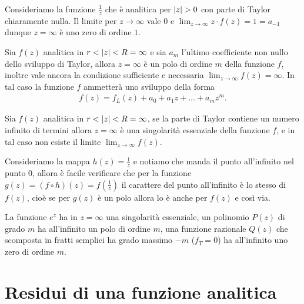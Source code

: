 \begin{example}
  Consideriamo la funzione $ \frac1z $ che è analitica per $ \left|{z}\right| > 0 $ con parte di Taylor chiaramente nulla. Il limite per $ z \to \infty $ vale 
  $ 0 $ e $ \lim_{z\to\infty} z \cdot f(z) = 1 = a_{-1} $ dunque $ z = \infty $ è uno zero di ordine $ 1 $.
\end{example}

\begin{definition}[  ]
  Sia $ f(z) $ analitica in $ r < \left|{z}\right| < R = \infty $ e sia $ a_{m} $ l'ultimo coefficiente non nullo dello sviluppo di Taylor, allora $ z = \infty $ 
  è un polo di ordine $ m $ della funzione $ f $, inoltre vale ancora la condizione sufficiente e necessaria $ \lim_{z\to \infty} f(z) = \infty $.
  In tal caso la funzione $ f $ ammetterà uno sviluppo della forma 
  \begin{align}
    f(z) = f_L(z) + a_0 + a_1 z + \dots + a_m z^m.
  \end{align}
\end{definition}

\begin{definition}[  ]
  Sia $ f(z) $ analitica in $ r < \left|{z}\right| < R = \infty $, se la parte di Taylor contiene un numero infinito di termini allora 
  $ z = \infty $ è una singolarità essenziale della funzione $ f $, e in tal caso non esiste il limite $ \lim_{z\to \infty} f(z) $.
\end{definition}

\begin{remark}
  Consideriamo la mappa $ h(z) = \frac1z $ e notiamo che manda il punto all'infinito nel punto $ 0 $, allora è facile verificare che per la funzione 
  $ g(z) = (f \circ h)(z) = f\left( \frac1z \right) $ il carattere del punto all'infinito è lo stesso di $ f(z) $, cioè se per $ g(z) $ è un polo allora lo è anche per $ f(z) $ 
  e così via.
\end{remark}

\begin{example}
  La funzione $ e^z $ ha in $ z = \infty $ una singolarità essenziale, un polinomio $ P(z) $ di grado $ m $ ha all'infinito un polo di ordine $ m $,
  una funzione razionale $ Q(z) $ che scomposta in fratti semplici ha grado massimo $ -m $ ($ f_T = 0 $) ha all'infinito uno zero di ordine $ m $.
\end{example}

\section{Residui di una funzione analitica}

